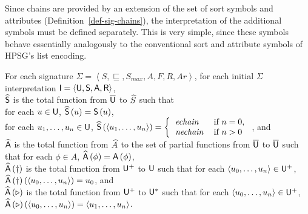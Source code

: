 \documentclass[output=paper
 	        ,biblatex
                ,babelshorthands
                ,newtxmath
                ,draftmode
                ,colorlinks, citecolor=brown
]{langscibook}
\begin{document}
{Since chains are provided by an extension of the set of sort symbols
and attributes (Definition~\ref{def-sig-chains}), the interpretation of the additional symbols must be
defined separately. This is very simple, since these
symbols behave essentially analogously to the conventional sort and attribute
symbols of HPSG's list encoding.

\begin{mydef}\label{def-expanded-interpretation}
  For each signature $\Sigma=\left<S,\sqsubseteq,S_{max},A,F,R,Ar\right>$,
  for each initial $\Sigma$ interpretation $\mathsf{I}=\langle\mathsf{U},\mathsf{S},\mathsf{A},\mathsf{R}\rangle$,\\
  $\widehat{\mathsf{S}}$ is the total function from $\overline{\mathsf{U}}$ to $\widehat{S}$
  such that\\
  \hspace*{.5cm} for each $u\in\mathsf{U}$, $\widehat{\mathsf{S}}\left(u\right)=\mathsf{S}\left(u\right)$,\\
  \hspace*{.5cm} for each $u_1, \ldots, u_n\in\Unive$,
            \(\Aug{\Speci}\left(\left<u_1,\ldots,u_n\right>\right)=\left\{
\begin{tabular}{ll}
$\mathit{echain}$
&
if $n = 0$,\\
$\mathit{nechain}$
&
if $n > 0$
\end{tabular}
\right.\), and\\
$\widehat{\mathsf{A}}$ is the total function from $\widehat{A}$ to the set of partial
functions from $\overline{\mathsf{U}}$ to $\overline{\mathsf{U}}$ such that
\hspace*{.5cm} for each $\phi\in A$, $\widehat{\mathsf{A}}\left(\phi\right)=\mathsf{A}\left(\phi\right)$,\\
\hspace*{.5cm} $\widehat{\mathsf{A}}\left(\dagger\right)$ is the total function from
$\mathsf{U}^{+}$ to $\mathsf{U}$ such that for each
$\left<u_0,\ldots,u_n\right>\in\Unive^{+}$,\\
\hspace*{1cm} $\Aug{\Atti}\left(\dagger\right)\left(\left<u_0,\ldots,u_n\right>\right)=u_0$, and\\
\hspace*{.5cm} $\widehat{\mathsf{A}}\left(\triangleright\right)$ is the total function from
$\mathsf{U}^{+}$ to $\mathsf{U}^{*}$ such that for each
$\left<u_0,\ldots,u_n\right>\in\Unive^{+}$,\\
\hspace*{1cm} $\Aug{\Atti}\left(\triangleright\right)\left(\left<u_0,\ldots,u_n\right>\right)=\left<u_1,\ldots,u_n\right>$.
\end{mydef}

}
\end{document}

